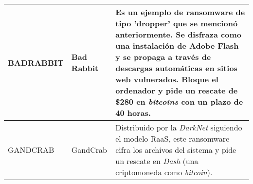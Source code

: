 {\begin{longtable}{|p{}|p{}|p{}|}
    BADRABBIT & 
    Bad Rabbit &
    Es un ejemplo de ransomware de tipo 'dropper' que se mencionó anteriormente. Se disfraza como una instalación de Adobe Flash y se propaga a través de descargas automáticas en sitios web vulnerados. Bloque el ordenador y pide un rescate de \$280 en \textit{bitcoins} con un plazo de 40 horas. \cite{27}\\
\hline
    GANDCRAB & 
    GandCrab &
    Distribuido por la \textit{DarkNet} siguiendo el modelo \gls{RaaS}, este ransomware cifra los archivos del sistema y pide un rescate en \textit{Dash} (una criptomoneda como \textit{bitcoin}). \cite{28}\\
\hline
\end{longtable}}